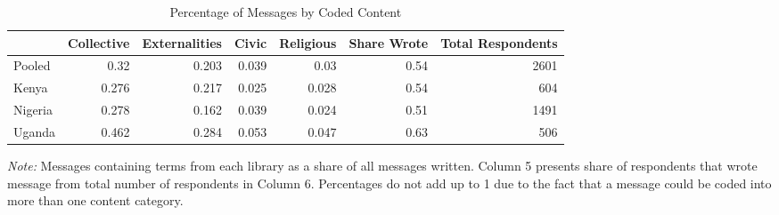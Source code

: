 \begin{table}[htb]
\centering
\caption{Percentage of Messages by Coded Content} 
\label{tab_share_msg}
\begin{tabular}{lrrrrrr}
  \hline
 & Collective & Externalities & Civic & Religious & Share Wrote & Total Respondents \\ 
  \hline
Pooled & 0.32 & 0.203 & 0.039 & 0.03 & 0.54 & 2601 \\ 
  Kenya & 0.276 & 0.217 & 0.025 & 0.028 & 0.54 & 604 \\ 
  Nigeria & 0.278 & 0.162 & 0.039 & 0.024 & 0.51 & 1491 \\ 
  Uganda & 0.462 & 0.284 & 0.053 & 0.047 & 0.63 & 506 \\ 
   \hline
\end{tabular}
\begin{flushleft}\textit{Note:} Messages containing terms from each library as a share of all messages written. Column 5 presents share of respondents that wrote message from total number of respondents in Column 6. Percentages do not add up to 1 due to the fact that a message could be coded into more than one content category.  \end{flushleft}
\end{table}
